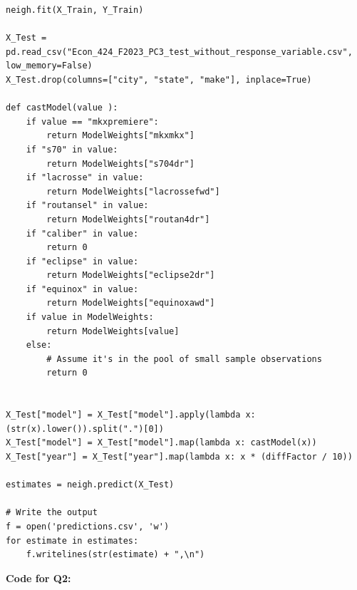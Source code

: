 \documentclass{article}
\begin{document}
\begin{lstlisting}
neigh.fit(X_Train, Y_Train)

X_Test = pd.read_csv("Econ_424_F2023_PC3_test_without_response_variable.csv", low_memory=False)
X_Test.drop(columns=["city", "state", "make"], inplace=True)

def castModel(value ):
    if value == "mkxpremiere":
        return ModelWeights["mkxmkx"]
    if "s70" in value:
        return ModelWeights["s704dr"]
    if "lacrosse" in value:
        return ModelWeights["lacrossefwd"]
    if "routansel" in value:
        return ModelWeights["routan4dr"]
    if "caliber" in value:
        return 0
    if "eclipse" in value:
        return ModelWeights["eclipse2dr"]
    if "equinox" in value:
        return ModelWeights["equinoxawd"]
    if value in ModelWeights:
        return ModelWeights[value]
    else:
        # Assume it's in the pool of small sample observations
        return 0


X_Test["model"] = X_Test["model"].apply(lambda x: (str(x).lower()).split(".")[0])
X_Test["model"] = X_Test["model"].map(lambda x: castModel(x))
X_Test["year"] = X_Test["year"].map(lambda x: x * (diffFactor / 10))

estimates = neigh.predict(X_Test)

# Write the output
f = open('predictions.csv', 'w')
for estimate in estimates:
    f.writelines(str(estimate) + ",\n")
\end{lstlisting}
\newpage
\textbf{Code for Q2:}
\end{document}

